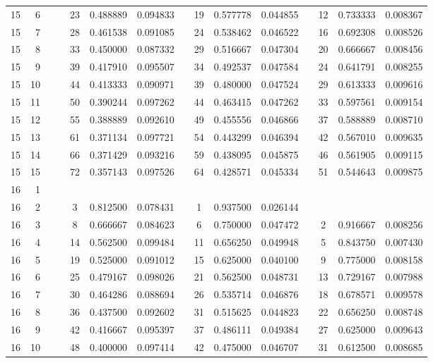 \begin{appendix}
\begin{longtable}[h]{rrrcccccccccccc}
15	&	6	&&&	23	&	0.488889	&	0.094833	&&	19	&	0.577778	&	0.044855	&&	12	&	0.733333	&	0.008367	\\
15	&	7	&&&	28	&	0.461538	&	0.091085	&&	24	&	0.538462	&	0.046522	&&	16	&	0.692308	&	0.008526	\\
15	&	8	&&&	33	&	0.450000	&	0.087332	&&	29	&	0.516667	&	0.047304	&&	20	&	0.666667	&	0.008456	\\
15	&	9	&&&	39	&	0.417910	&	0.095507	&&	34	&	0.492537	&	0.047584	&&	24	&	0.641791	&	0.008255	\\
15	&	10	&&&	44	&	0.413333	&	0.090971	&&	39	&	0.480000	&	0.047524	&&	29	&	0.613333	&	0.009616	\\
15	&	11	&&&	50	&	0.390244	&	0.097262	&&	44	&	0.463415	&	0.047262	&&	33	&	0.597561	&	0.009154	\\
15	&	12	&&&	55	&	0.388889	&	0.092610	&&	49	&	0.455556	&	0.046866	&&	37	&	0.588889	&	0.008710	\\
15	&	13	&&&	61	&	0.371134	&	0.097721	&&	54	&	0.443299	&	0.046394	&&	42	&	0.567010	&	0.009635	\\
15	&	14	&&&	66	&	0.371429	&	0.093216	&&	59	&	0.438095	&	0.045875	&&	46	&	0.561905	&	0.009115	\\
15	&	15	&&&	72	&	0.357143	&	0.097526	&&	64	&	0.428571	&	0.045334	&&	51	&	0.544643	&	0.009875	\\
16	&	1	&&&		&		&		&&		&		&		&&		&		&		\\
16	&	2	&&&	3	&	0.812500	&	0.078431	&&	1	&	0.937500	&	0.026144	&&		&		&		\\
16	&	3	&&&	8	&	0.666667	&	0.084623	&&	6	&	0.750000	&	0.047472	&&	2	&	0.916667	&	0.008256	\\
16	&	4	&&&	14	&	0.562500	&	0.099484	&&	11	&	0.656250	&	0.049948	&&	5	&	0.843750	&	0.007430	\\
16	&	5	&&&	19	&	0.525000	&	0.091012	&&	15	&	0.625000	&	0.040100	&&	9	&	0.775000	&	0.008158	\\
16	&	6	&&&	25	&	0.479167	&	0.098026	&&	21	&	0.562500	&	0.048731	&&	13	&	0.729167	&	0.007988	\\
16	&	7	&&&	30	&	0.464286	&	0.088694	&&	26	&	0.535714	&	0.046876	&&	18	&	0.678571	&	0.009578	\\
16	&	8	&&&	36	&	0.437500	&	0.092602	&&	31	&	0.515625	&	0.044823	&&	22	&	0.656250	&	0.008748	\\
16	&	9	&&&	42	&	0.416667	&	0.095397	&&	37	&	0.486111	&	0.049384	&&	27	&	0.625000	&	0.009643	\\
16	&	10	&&&	48	&	0.400000	&	0.097414	&&	42	&	0.475000	&	0.046707	&&	31	&	0.612500	&	0.008685	\\

\end{longtable}
\end{appendix}
